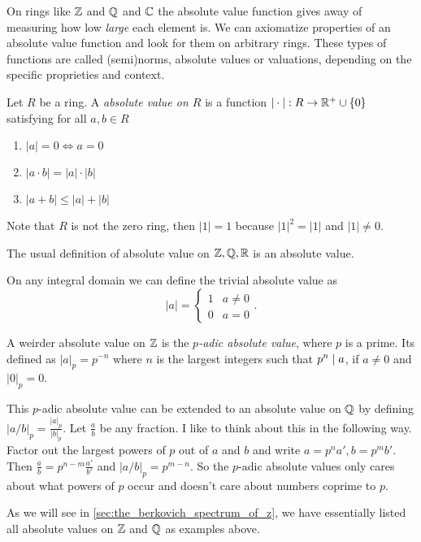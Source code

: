 On rings like $\mathbb{Z}$ and $\mathbb{Q}$ and $\mathbb{C}$ the absolute value function gives away of measuring how low \emph{large} each element is. 
We can axiomatize properties of an absolute value function and look for them on arbitrary rings. 
These types of functions are called (semi)norms, absolute values or valuations, depending on the specific proprieties and context.  
\begin{definition}
	Let $R$ be a ring. A \emph{absolute value on $R$} is a function $|\cdot |: R \to \mathbb{R}^{+} \cup \{0\} $ satisfying for all $a, b \in R$
	\begin{enumerate}
		\item $|a| = 0 \iff a = 0$ 
		\item $|a \cdot b| = |a| \cdot |b|$ 
		\item $|a + b| \le |a| + |b|$
	\end{enumerate}
\end{definition}
Note that $R$ is not the zero ring, then $|1| = 1$ because $|1|^2 = |1| $ and $|1|\ne 0 $. 
\begin{example}
	The usual definition of absolute value on $\mathbb{Z}, \mathbb{Q}, \mathbb{R}$ is an absolute value. 
\end{example}
\begin{example}
	On any integral domain we can define the trivial absolute value as \[
	 |a| = \begin{cases}
		 1 & a \ne 0 \\
		 0 & a = 0
	 \end{cases}
	.\] 
\end{example}
\begin{example}
	A weirder absolute value on $\mathbb{Z}$ is the \emph{$p$-adic absolute value}, where $p$ is a prime. 
	Its defined as $|a|_p = p^{-n}$ where $n$ is the largest integers such that $p^{n} \mid a$, if $a \ne 0$ and $|0|_p = 0$. 


	This $p$-adic absolute value can be extended to an absolute value on $\mathbb{Q}$ by defining $|a / b|_p = \frac{|a|_p}{|b|_p}$. Let $\frac{a}{b}$ be any fraction. 
	I like to think about this in the following way. 
	Factor out the largest powers of $p$ out of $a$ and $b$ and write $a = p^{n} a', b = p^{m} b'$. Then $\frac{a}{ b} = p^{n - m} \frac{a'}{ b'}$ and $|a / b|_p = p^{m - n}$. 
	So the $p$-adic absolute values only cares about what powers of $p$ occur and doesn't care about numbers coprime to $p $.
\end{example}
As we will see in \cref{sec:the_berkovich_spectrum_of_z}, we have essentially listed all absolute values on $\mathbb{Z}$ and $\mathbb{Q}$ as examples above.  

